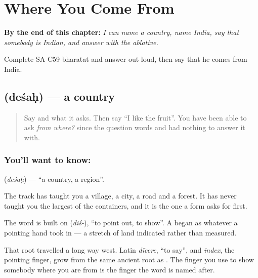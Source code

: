 
\chapter{Where You Come From}
\label{ch:sa-where-you-come-from}

\begin{chapteropening}
\textbf{By the end of this chapter:} \emph{I can name a country, name India, say that somebody is Indian, and answer  with the ablative.}

Complete SA-C59-bharatat and answer  out loud, then say that he comes from India.
\end{chapteropening}

\section[\texorpdfstring{\sk{देशः} (deśaḥ)}{देशः (deśaḥ)}]{ (deśaḥ) — a country}

\label{lesson:SA-C59-desha}



\begin{quote}
Say \textbf{} and what it asks. Then say \textquotedblleft{}I like the fruit\textquotedblright{}. You have been able to ask \emph{from where?} since the question words and had nothing to answer it with.
\end{quote}

\subsection*{You'll want to know: }
\textbf{} (\emph{deśaḥ}) — \textquotedblleft{}a country, a region\textquotedblright{}.

The track has taught you a village, a city, a road and a forest. It has never taught you the largest of the containers, and it is the one a form asks for first.

The word is built on \textbf{} (\emph{diś-}), \textquotedblleft{}to point out, to show\textquotedblright{}. A \textbf{} began as whatever a pointing hand took in — a stretch of land indicated rather than measured.

That root travelled a long way west. Latin \emph{dīcere}, \textquotedblleft{}to say\textquotedblright{}, and \emph{index}, the pointing finger, grow from the same ancient root as \textbf{}. The finger you use to show somebody where you are from is the finger the word is named after.

